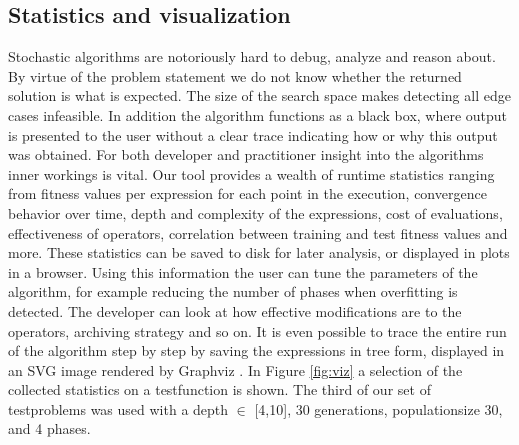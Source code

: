 \subsection{Statistics and visualization}
Stochastic algorithms are notoriously hard to debug, analyze and reason about. By virtue of the problem statement we do not know whether the returned solution is what is expected. The size of the search space makes detecting all edge cases infeasible. In addition the algorithm functions as a black box, where output is presented to the user without a clear trace indicating how or why this output was obtained. For both developer and practitioner insight into the algorithms inner workings is vital.
Our tool provides a wealth of runtime statistics ranging from fitness values per expression for each point in the execution, convergence behavior over time, depth and complexity of the expressions, cost of evaluations, effectiveness of operators, correlation between training and test fitness values and more. These statistics can be saved to disk for later analysis, or displayed in plots in a browser. Using this information the user can tune the parameters of the algorithm, for example reducing the number of phases when overfitting is detected. The developer can look at how effective modifications are to the operators, archiving strategy and so on.
It is even possible to trace the entire run of the algorithm step by step by saving the expressions in tree form, displayed in an SVG image rendered by Graphviz \cite{graphviz}. In Figure \ref{fig:viz} a selection of the collected statistics on a testfunction is shown. The third of our set of testproblems was used with a depth $\in$ [4,10], 30 generations, populationsize 30, and 4 phases.
